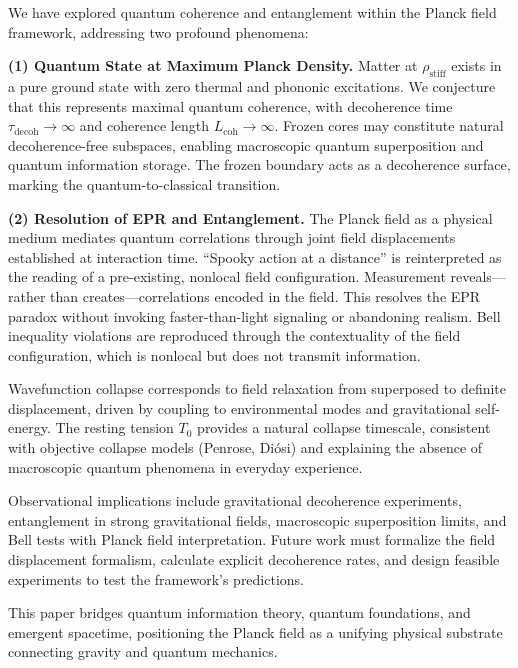 \documentclass[11pt,a4paper]{article}
\newcommand{\rhostiff}{\ensuremath{\rho_{\mathrm{stiff}}}}
\newcommand{\Tzero}{\ensuremath{T_0}}
\newcommand{\taudecoh}{\ensuremath{\tau_{\mathrm{decoh}}}}
\newcommand{\Lcoh}{\ensuremath{L_{\mathrm{coh}}}}
\theoremstyle{definition}
\theoremstyle{remark}
\begin{document}
We have explored quantum coherence and entanglement within the Planck field framework, addressing two profound phenomena:

\textbf{(1) Quantum State at Maximum Planck Density.} Matter at $\rhostiff$ exists in a pure ground state with zero thermal and phononic excitations. We conjecture that this represents maximal quantum coherence, with decoherence time $\taudecoh \to \infty$ and coherence length $\Lcoh \to \infty$. Frozen cores may constitute natural decoherence-free subspaces, enabling macroscopic quantum superposition and quantum information storage. The frozen boundary acts as a decoherence surface, marking the quantum-to-classical transition.

\textbf{(2) Resolution of EPR and Entanglement.} The Planck field as a physical medium mediates quantum correlations through joint field displacements established at interaction time. ``Spooky action at a distance'' is reinterpreted as the reading of a pre-existing, nonlocal field configuration. Measurement reveals---rather than creates---correlations encoded in the field. This resolves the EPR paradox without invoking faster-than-light signaling or abandoning realism. Bell inequality violations are reproduced through the contextuality of the field configuration, which is nonlocal but does not transmit information.

Wavefunction collapse corresponds to field relaxation from superposed to definite displacement, driven by coupling to environmental modes and gravitational self-energy. The resting tension $\Tzero$ provides a natural collapse timescale, consistent with objective collapse models (Penrose, Di\'osi) and explaining the absence of macroscopic quantum phenomena in everyday experience.

Observational implications include gravitational decoherence experiments, entanglement in strong gravitational fields, macroscopic superposition limits, and Bell tests with Planck field interpretation. Future work must formalize the field displacement formalism, calculate explicit decoherence rates, and design feasible experiments to test the framework's predictions.

This paper bridges quantum information theory, quantum foundations, and emergent spacetime, positioning the Planck field as a unifying physical substrate connecting gravity and quantum mechanics.

\end{document}
